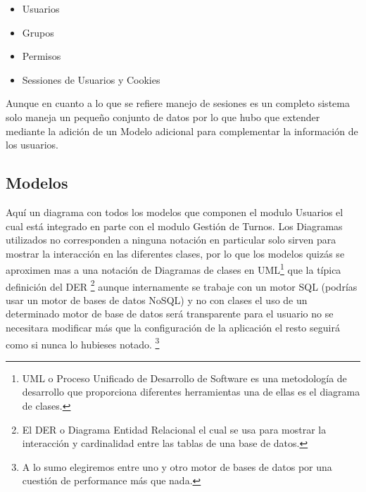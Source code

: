 \begin{itemize}
    \item Usuarios
    \item Grupos
    \item Permisos
    \item Sessiones de Usuarios y Cookies
\end{itemize}

Aunque en cuanto a lo que se refiere manejo de sesiones es un completo sistema solo maneja un pequeño conjunto de datos por lo que hubo que extender mediante la adición de un Modelo adicional para complementar la información de los usuarios.


\subsection{Modelos}

Aquí un diagrama con todos los modelos que componen el modulo Usuarios el cual está integrado en parte con el modulo Gestión de Turnos. Los Diagramas utilizados no corresponden a ninguna notación en particular solo sirven para mostrar la interacción en las diferentes clases, por lo que los modelos quizás se aproximen mas a una notación de Diagramas de clases en UML\footnote{UML o Proceso Unificado de Desarrollo de Software es una metodología de desarrollo que proporciona diferentes herramientas una de ellas es el diagrama de clases.} que la típica definición del DER \footnote{El DER o Diagrama Entidad Relacional el cual se usa para mostrar la interacción y cardinalidad entre las tablas de una base de datos.} aunque internamente se trabaje con un motor SQL (podrías usar un motor de bases de datos NoSQL)  y no con clases el uso de un determinado motor de base de datos será transparente para el usuario no se necesitara modificar más que la configuración de la aplicación el resto seguirá como si nunca lo hubieses notado. \footnote{A lo sumo elegiremos entre uno y otro motor de bases de datos por una cuestión de performance más que nada.}

